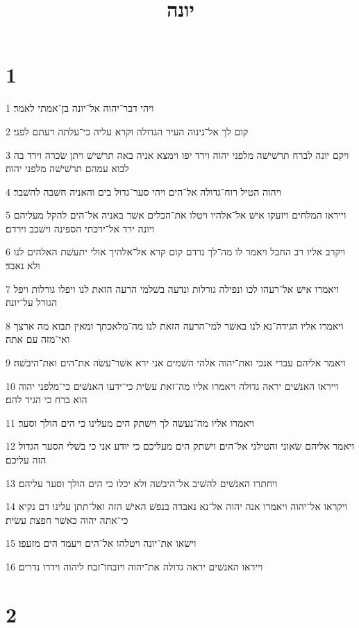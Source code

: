 

\title{יונה}


\chapter{1}

\par 1 ויהי דבר־יהוה אל־יונה בן־אמתי לאמר׃
\par 2 קום לך אל־נינוה העיר הגדולה וקרא עליה כי־עלתה רעתם לפני׃
\par 3 ויקם יונה לברח תרשׁישׁה מלפני יהוה וירד יפו וימצא אניה באה תרשׁישׁ ויתן שׂכרה וירד בה לבוא עמהם תרשׁישׁה מלפני יהוה׃
\par 4 ויהוה הטיל רוח־גדולה אל־הים ויהי סער־גדול בים והאניה חשׁבה להשׁבר׃
\par 5 וייראו המלחים ויזעקו אישׁ אל־אלהיו ויטלו את־הכלים אשׁר באניה אל־הים להקל מעליהם ויונה ירד אל־ירכתי הספינה וישׁכב וירדם׃
\par 6 ויקרב אליו רב החבל ויאמר לו מה־לך נרדם קום קרא אל־אלהיך אולי יתעשׁת האלהים לנו ולא נאבד׃
\par 7 ויאמרו אישׁ אל־רעהו לכו ונפילה גורלות ונדעה בשׁלמי הרעה הזאת לנו ויפלו גורלות ויפל הגורל על־יונה׃
\par 8 ויאמרו אליו הגידה־נא לנו באשׁר למי־הרעה הזאת לנו מה־מלאכתך ומאין תבוא מה ארצך ואי־מזה עם אתה׃
\par 9 ויאמר אליהם עברי אנכי ואת־יהוה אלהי השׁמים אני ירא אשׁר־עשׂה את־הים ואת־היבשׁה׃
\par 10 וייראו האנשׁים יראה גדולה ויאמרו אליו מה־זאת עשׂית כי־ידעו האנשׁים כי־מלפני יהוה הוא ברח כי הגיד להם׃
\par 11 ויאמרו אליו מה־נעשׂה לך וישׁתק הים מעלינו כי הים הולך וסער׃
\par 12 ויאמר אליהם שׂאוני והטילני אל־הים וישׁתק הים מעליכם כי יודע אני כי בשׁלי הסער הגדול הזה עליכם׃
\par 13 ויחתרו האנשׁים להשׁיב אל־היבשׁה ולא יכלו כי הים הולך וסער עליהם׃
\par 14 ויקראו אל־יהוה ויאמרו אנה יהוה אל־נא נאבדה בנפשׁ האישׁ הזה ואל־תתן עלינו דם נקיא כי־אתה יהוה כאשׁר חפצת עשׂית׃
\par 15 וישׂאו את־יונה ויטלהו אל־הים ויעמד הים מזעפו׃
\par 16 וייראו האנשׁים יראה גדולה את־יהוה ויזבחו־זבח ליהוה וידרו נדרים׃

\chapter{2}

